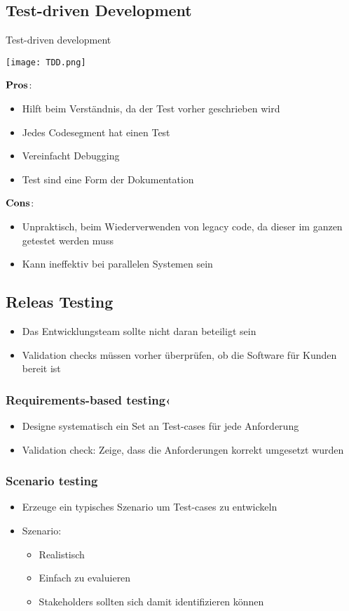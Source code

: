 \subsection{Test-driven Development}
\begin{table}[H]
\caption{Test-driven development}
\texttt{[image: TDD.png]}
\end{table}
\begin{multicols}{2}
$\bold{Pros}$:
\begin{itemize}
	\item Hilft beim Verständnis, da der Test vorher geschrieben wird
	\item Jedes Codesegment hat einen Test
	\item Vereinfacht Debugging
	\item Test sind eine Form der Dokumentation
\end{itemize}
\columnbreak
$\bold{Cons}$:
\begin{itemize}
	\item Unpraktisch, beim Wiederverwenden von legacy code, da dieser im ganzen getestet werden muss
	\item Kann ineffektiv bei parallelen Systemen sein
\end{itemize}
\end{multicols}
\subsection{Releas Testing}
\begin{itemize}
	\item Das Entwicklungsteam sollte nicht daran beteiligt sein
	\item Validation checks müssen vorher überprüfen, ob die Software für Kunden bereit ist 
\end{itemize}
\subsubsection{Requirements-based testing‹}
\begin{itemize}
	\item Designe systematisch ein Set an Test-cases für jede Anforderung
	\item Validation check: Zeige, dass die Anforderungen korrekt umgesetzt wurden   
\end{itemize}
\subsubsection{Scenario testing}
\begin{itemize}
	\item Erzeuge ein typisches Szenario um Test-cases zu entwickeln
	\item Szenario:
		\begin{itemize}
			\item Realistisch
			\item Einfach zu evaluieren
			\item Stakeholders sollten sich damit identifizieren können
		\end{itemize}
\end{itemize}
